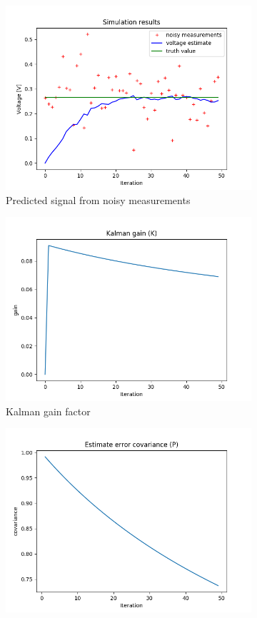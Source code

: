 \documentclass{article}
\begin{document}
    \begin{figure}
        \begin{subfigure} {.5\textwidth}  
            \centering 
            \includegraphics[width=0.8\linewidth]{./img/r10q_.png}
            \caption{Predicted signal from noisy measurements }
        \end{subfigure}
        \begin{subfigure}{.5\textwidth}            
            \centering
            \includegraphics[width=0.8\linewidth]{./img/r10q_K.png}
            \caption{Kalman gain factor}
        \end{subfigure}
        \begin{subfigure} {.5\textwidth}  
            \centering 
            \includegraphics[width=0.8\linewidth]{./img/r10q_P.png}

\end{subfigure}
\end{figure}
\end{document}
